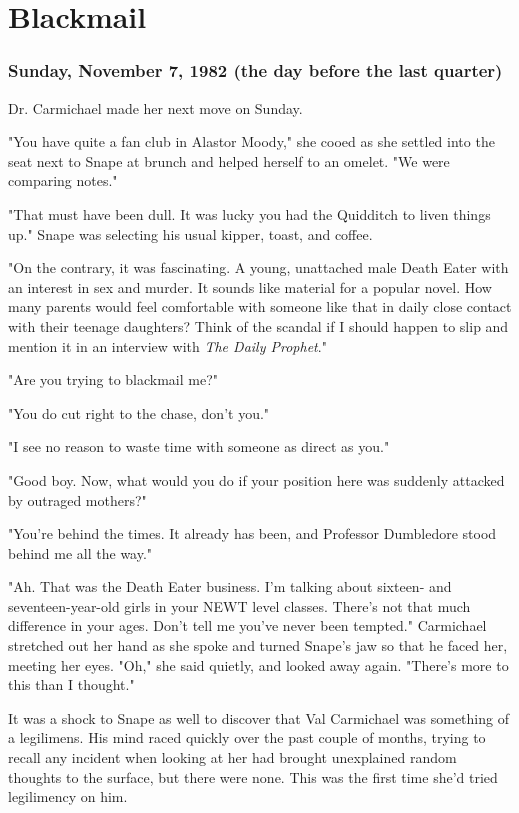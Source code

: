
\chapter{Blackmail}

\subsection{Sunday, November 7, 1982 (the day before the last quarter)}

Dr. Carmichael made her next move on Sunday.

"You have quite a fan club in Alastor Moody," she cooed as she settled into the seat next to Snape at brunch and helped herself to an omelet. "We were comparing notes."

"That must have been dull. It was lucky you had the Quidditch to liven things up." Snape was selecting his usual kipper, toast, and coffee.

"On the contrary, it was fascinating. A young, unattached male Death Eater with an interest in sex and murder. It sounds like material for a popular novel. How many parents would feel comfortable with someone like that in daily close contact with their teenage daughters? Think of the scandal if I should happen to slip and mention it in an interview with \emph{The Daily Prophet}."

"Are you trying to blackmail me?"

"You do cut right to the chase, don't you."

"I see no reason to waste time with someone as direct as you."

"Good boy. Now, what would you do if your position here was suddenly attacked by outraged mothers?"

"You're behind the times. It already has been, and Professor Dumbledore stood behind me all the way."

"Ah. That was the Death Eater business. I'm talking about sixteen- and seventeen-year-old girls in your NEWT level classes. There's not that much difference in your ages. Don't tell me you've never been tempted." Carmichael stretched out her hand as she spoke and turned Snape's jaw so that he faced her, meeting her eyes. "Oh," she said quietly, and looked away again. "There's more to this than I thought."

It was a shock to Snape as well to discover that Val Carmichael was something of a legilimens. His mind raced quickly over the past couple of months, trying to recall any incident when looking at her had brought unexplained random thoughts to the surface, but there were none. This was the first time she'd tried legilimency on him.

